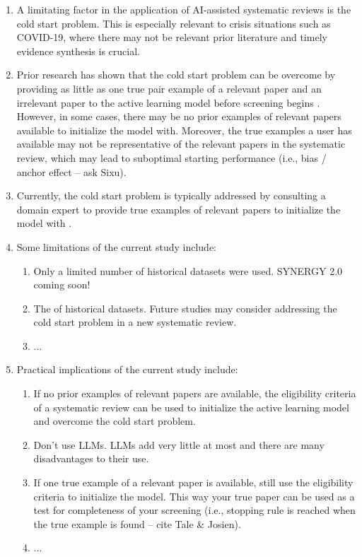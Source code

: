 \documentclass[12pt]{article}
\begin{document}
\begin{enumerate}
  \item A limitating factor in the application of AI-assisted systematic reviews is the cold start problem. This is especially relevant to crisis situations such as COVID-19, where there may not be relevant prior literature and timely evidence synthesis is crucial.
  \item Prior research has shown that the cold start problem can be overcome by providing as little as one true pair example of a relevant paper and an irrelevant paper to the active learning model before screening begins \parencite{ferdinands2023performance,teijema2025large}. However, in some cases, there may be no prior examples of relevant papers available to initialize the model with. Moreover, the true examples a user has available may not be representative of the relevant papers in the systematic review, which may lead to suboptimal starting performance (i.e., bias / anchor effect -- ask Sixu).
  \item Currently, the cold start problem is typically addressed by consulting a domain expert to provide true examples of relevant papers to initialize the model with \parencite{mikkola2024prior}. 
  \item Some limitations of the current study include:
    \begin{enumerate}
        \item Only a limited number of historical datasets were used. SYNERGY 2.0 coming soon!
        \item The of historical datasets. Future studies may consider addressing the cold start problem in a new systematic review.
        \item ...
    \end{enumerate}
  \item Practical implications of the current study include:
    \begin{enumerate}
        \item If no prior examples of relevant papers are available, the eligibility criteria of a systematic review can be used to initialize the active learning model and overcome the cold start problem. 
        \item Don't use LLMs. LLMs add very little at most and there are many disadvantages to their use.
        \item If one true example of a relevant paper is available, still use the eligibility criteria to initialize the model. This way your true paper can be used as a test for completeness of your screening (i.e., stopping rule is reached when the true example is found -- cite Tale \& Josien).
        \item ...
    \end{enumerate}
\end{enumerate}
\end{document}
